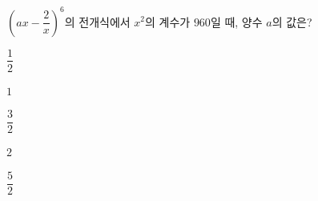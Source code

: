 $\left(ax-\dfrac{2}{x}\right)^6$의 전개식에서 $x^2$의 계수가 $960$일 때, 양수 $a$의 값은?
\begin{choicesii}{\rule[-3ex]{0pt}{8ex}$\dfrac{1}{2}$}{\rule[-3ex]{0pt}{8ex}$1$}{\rule[-3ex]{0pt}{8ex}$\dfrac{3}{2}$}{\rule[-3ex]{0pt}{8ex}$2$}{\rule[-3ex]{0pt}{8ex}$\dfrac{5}{2}$}\end{choicesii}
